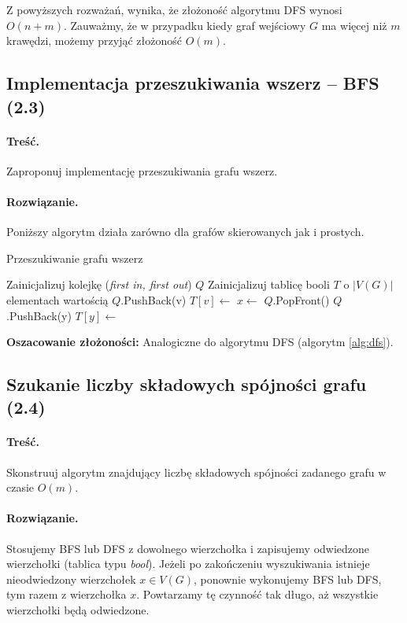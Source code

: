 Z powyższych rozważań, wynika, że złożoność algorytmu DFS wynosi $O(n + m)$. Zauważmy, że
w przypadku kiedy graf wejściowy $G$ ma więcej niż $m$ krawędzi, możemy przyjąć złożoność $O(m)$.

\subsection{Implementacja przeszukiwania wszerz -- BFS (2.3)}
\label{zad:bfs}
\paragraph{Treść.} Zaproponuj implementację
przeszukiwania grafu wszerz.
\paragraph{Rozwiązanie.}
Poniższy algorytm działa zarówno dla grafów skierowanych
jak i prostych.

\begin{algorithm}[H]
	\caption{Przeszukiwanie grafu wszerz}\label{Zadanie23}
	\begin{algorithmic}[1]
		\State Zainicjalizuj kolejkę (\textit{first in, first out}) $Q$
		\State Zainicjalizuj tablicę booli $T$ o $|V(G)|$ elementach wartością 
		\false
		\State $Q$.PushBack(v)
		\State $T[v] \gets$ \false
		\State $x \gets$ $Q$.PopFront()
		\State $Q$.PushBack(y)
		\State $T[y] \gets$ \true
		\EndIf
		\EndWhile
		\EndWhile
		\EndProcedure
	\end{algorithmic}
\end{algorithm}

\textbf{Oszacowanie złożoności:} Analogiczne do algorytmu DFS (algorytm \ref{alg:dfs}).

\subsection{Szukanie liczby składowych spójności grafu (2.4)}

\paragraph{Treść.} Skonstruuj algorytm znajdujący liczbę składowych 
spójności zadanego grafu w czasie $O(m)$.

\paragraph{Rozwiązanie.} Stosujemy BFS lub DFS z dowolnego 
wierzchołka i zapisujemy odwiedzone wierzchołki (tablica typu \textit{bool}).
Jeżeli po zakończeniu wyszukiwania istnieje nieodwiedzony wierzchołek $x \in V(G)$,
 ponownie wykonujemy BFS lub DFS, tym razem z wierzchołka $x$.
Powtarzamy tę czynność tak długo, aż wszystkie wierzchołki będą odwiedzone. 


